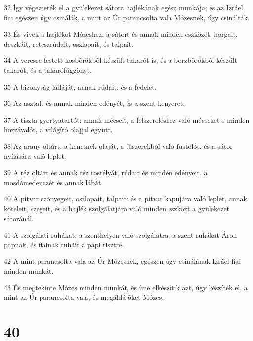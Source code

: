 \par 32 Így végezteték el a gyülekezet sátora hajlékának egész munkája; és az Izráel fiai egészen úgy csinálák, a mint az Úr parancsolta vala Mózesnek, úgy csinálták.
\par 33 És vivék a hajlékot Mózeshez: a sátort és annak minden eszközét, horgait, deszkáit, reteszrúdait, oszlopait, és talpait.
\par 34 A veresre festett kosbõrökbõl készült takarót is, és a borzbõrökbõl készült takarót, és a takarófüggönyt.
\par 35 A bizonyság ládáját, annak rúdait, és a fedelet.
\par 36 Az asztalt és annak minden edényét, és a szent kenyeret.
\par 37 A tiszta gyertyatartót: annak mécseit, a felszereléshez való mécseket s minden hozzávalót, a világító olajjal együtt.
\par 38 Az arany oltárt, a kenetnek olaját, a fûszerekbõl való füstölõt, és a sátor nyílására való leplet.
\par 39 A réz oltárt és annak réz rostélyát, rúdait és minden edényeit, a mosdómedenczét és annak lábát.
\par 40 A pitvar szõnyegeit, oszlopait, talpait: és a pitvar kapujára való leplet, annak köteleit, szegeit, és a hajlék szolgálatjára való minden eszközt a gyülekezet sátoránál.
\par 41 A szolgálati ruhákat, a szenthelyen való szolgálatra, a szent ruhákat Áron papnak, és fiainak ruháit a papi tisztre.
\par 42 A mint parancsolta vala az Úr Mózesnek, egészen úgy csinálának Izráel fiai minden munkát.
\par 43 És megtekinte Mózes minden munkát, és ímé elkészítik azt, úgy készíték el, a mint az Úr parancsolta vala, és megáldá õket Mózes.

\chapter{40}

